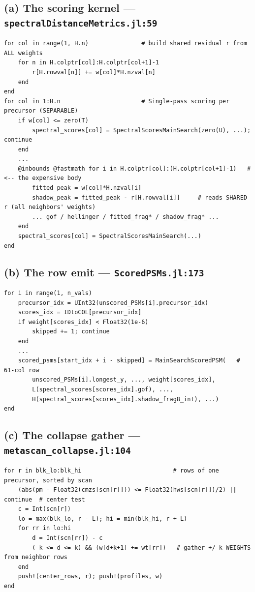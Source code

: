 \documentclass[11pt]{article}
\newcommand{\code}[1]{\texttt{\small #1}}
\begin{document}
\subsection*{(a) The scoring kernel --- \code{spectralDistanceMetrics.jl:59}}
\begin{lstlisting}[firstnumber=59]
for col in range(1, H.n)               # build shared residual r from ALL weights
    for n in H.colptr[col]:H.colptr[col+1]-1
        r[H.rowval[n]] += w[col]*H.nzval[n]
    end
end
for col in 1:H.n                       # Single-pass scoring per precursor (SEPARABLE)
    if w[col] <= zero(T)
        spectral_scores[col] = SpectralScoresMainSearch(zero(U), ...); continue
    end
    ...
    @inbounds @fastmath for i in H.colptr[col]:(H.colptr[col+1]-1)   # <-- the expensive body
        fitted_peak = w[col]*H.nzval[i]
        shadow_peak = fitted_peak - r[H.rowval[i]]     # reads SHARED r (all neighbors' weights)
        ... gof / hellinger / fitted_frag* / shadow_frag* ...
    end
    spectral_scores[col] = SpectralScoresMainSearch(...)
end
\end{lstlisting}

\subsection*{(b) The row emit --- \code{ScoredPSMs.jl:173}}
\begin{lstlisting}[firstnumber=173]
for i in range(1, n_vals)
    precursor_idx = UInt32(unscored_PSMs[i].precursor_idx)
    scores_idx = IDtoCOL[precursor_idx]
    if weight[scores_idx] < Float32(1e-6)
        skipped += 1; continue
    end
    ...
    scored_psms[start_idx + i - skipped] = MainSearchScoredPSM(   # 61-col row
        unscored_PSMs[i].longest_y, ..., weight[scores_idx],
        L(spectral_scores[scores_idx].gof), ...,
        H(spectral_scores[scores_idx].shadow_frag8_int), ...)
end
\end{lstlisting}

\subsection*{(c) The collapse gather --- \code{metascan\_collapse.jl:104}}
\begin{lstlisting}[firstnumber=104]
for r in blk_lo:blk_hi                          # rows of one precursor, sorted by scan
    (abs(pm - Float32(cmzs[scn[r]])) <= Float32(hws[scn[r]])/2) || continue  # center test
    c = Int(scn[r])
    lo = max(blk_lo, r - L); hi = min(blk_hi, r + L)
    for rr in lo:hi
        d = Int(scn[rr]) - c
        (-k <= d <= k) && (w[d+k+1] += wt[rr])   # gather +/-k WEIGHTS from neighbor rows
    end
    push!(center_rows, r); push!(profiles, w)
end
\end{lstlisting}
\end{document}
